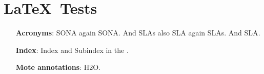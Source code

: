 
\cleardoublepage\chapter{\LaTeX~Tests}\minitoc\label{sec:latextest}\vspace{.5cm}
\noindent\lipsum[7]

\begin{itemize}
  \item[\textbf{Acronyms}:] \ac{SONA} again \ac{SONA}. And \acp{SLA} also \ac{SLA} again \acp{SLA}. And \acf{SLA}.
  \item[\textbf{Index}:] Index and Subindex in the \appendixname.
  \item[\textbf{Mote annotations}:] \ac{H2O}.
\end{itemize}


